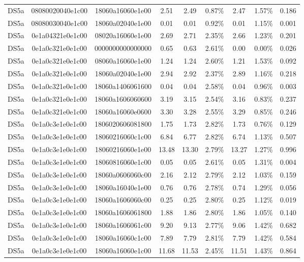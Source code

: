\begin{tabular}{|c|c c|c|c c|c c|c|}
  DS5a & 08080020040e1c00 & 18060a16060e1e00 & 2.51 & 2.49 & 0.87\% & 2.47 & 1.57\% & 0.186 \\
  DS5a & 08080030040e1c00 & 18060a02040e1e00 & 0.01 & 0.01 & 0.92\% & 0.01 & 1.15\% & 0.001 \\
  DS5a & 0e1a04321e0e1c00 & 08020a16060e1e00 & 2.69 & 2.71 & 2.35\% & 2.66 & 1.23\% & 0.201 \\
  DS5a & 0e1a0c321e0e1c00 & 0000000000000000 & 0.65 & 0.63 & 2.61\% & 0.00 & 0.00\% & 0.026 \\
  DS5a & 0e1a0c321e0e1c00 & 08060a16060e1e00 & 1.24 & 1.24 & 2.60\% & 1.21 & 1.53\% & 0.092 \\
  DS5a & 0e1a0c321e0e1c00 & 18060a02040e1e00 & 2.94 & 2.92 & 2.37\% & 2.89 & 1.16\% & 0.218 \\
  DS5a & 0e1a0c321e0e1c00 & 18060a1406061600 & 0.04 & 0.04 & 2.58\% & 0.04 & 0.96\% & 0.003 \\
  DS5a & 0e1a0c321e0e1c00 & 18060a1606060600 & 3.19 & 3.15 & 2.54\% & 3.16 & 0.83\% & 0.237 \\
  DS5a & 0e1a0c321e0e1c00 & 18060a16060e0600 & 3.30 & 3.28 & 2.55\% & 3.29 & 0.85\% & 0.246 \\
  DS5a & 0e1a0c3e1e0e1c00 & 1806020606081800 & 1.75 & 1.73 & 2.82\% & 1.73 & 0.76\% & 0.129 \\
  DS5a & 0e1a0c3e1e0e1c00 & 18060216060c1c00 & 6.84 & 6.77 & 2.82\% & 6.74 & 1.13\% & 0.507 \\
  DS5a & 0e1a0c3e1e0e1c00 & 18060216060e1e00 & 13.48 & 13.30 & 2.79\% & 13.27 & 1.27\% & 0.996 \\
  DS5a & 0e1a0c3e1e0e1c00 & 18060816060e1c00 & 0.05 & 0.05 & 2.61\% & 0.05 & 1.31\% & 0.004 \\
  DS5a & 0e1a0c3e1e0e1c00 & 18060a0606060c00 & 2.16 & 2.12 & 2.79\% & 2.12 & 1.03\% & 0.159 \\
  DS5a & 0e1a0c3e1e0e1c00 & 18060a16040e1e00 & 0.76 & 0.76 & 2.78\% & 0.74 & 1.29\% & 0.056 \\
  DS5a & 0e1a0c3e1e0e1c00 & 18060a1606060c00 & 0.25 & 0.25 & 2.80\% & 0.25 & 1.12\% & 0.019 \\
  DS5a & 0e1a0c3e1e0e1c00 & 18060a1606061800 & 1.88 & 1.86 & 2.80\% & 1.86 & 1.05\% & 0.140 \\
  DS5a & 0e1a0c3e1e0e1c00 & 18060a1606061c00 & 9.20 & 9.13 & 2.77\% & 9.06 & 1.42\% & 0.682 \\
  DS5a & 0e1a0c3e1e0e1c00 & 18060a16060c1c00 & 7.89 & 7.79 & 2.81\% & 7.79 & 1.42\% & 0.584 \\
  DS5a & 0e1a0c3e1e0e1c00 & 18060a16060e1c00 & 11.68 & 11.53 & 2.45\% & 11.51 & 1.43\% & 0.864 \\

\end{tabular}
